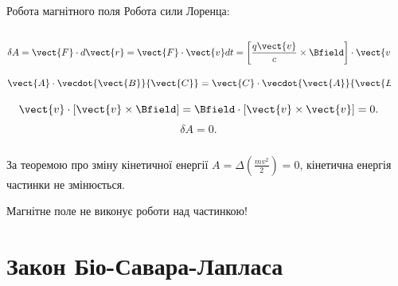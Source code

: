 \documentclass{beamer}
\begin{document}
\begin{frame}{Робота магнітного поля}{}
	Робота сили Лоренца:
	\begin{columns}
		\begin{column}{0.65\linewidth}
			\begin{equation*}
				\delta A = \vect{F}\cdot d\vect{r} = \vect{F}\cdot\vect{v}dt = \left[\frac{q \vect{v}}{c}\times\Bfield\right] \cdot\vect{v}dt.
			\end{equation*}
			\begin{block}{}\scriptsize
				\begin{equation*}
					\vect{A}\cdot\vecdot{\vect{B}}{\vect{C}} = \vect{C}\cdot\vecdot{\vect{A}}{\vect{B}}.
				\end{equation*}
			\end{block}
			\begin{equation*}
				\vect{v}\cdot\left[\vect{v}\times\Bfield\right] = \Bfield\cdot\left[\vect{v}\times\vect{v}\right] = 0.
			\end{equation*}
			\begin{equation*}
				\delta A = 0.
			\end{equation*}
		\end{column}
		\begin{column}{0.35\linewidth}\centering
            
		\end{column}
	\end{columns}
	\begin{block}{}
		За теоремою про зміну кінетичної енергії $A = \Delta\left(\frac{mv^2}{2}\right) = 0$, кінетична енергія частинки не змінюється.
	\end{block}
	\begin{alertblock}{}\centering
		Магнітне поле не виконує роботи над частинкою!
	\end{alertblock}
\end{frame}



\section{Закон Біо-Савара-Лапласа}
\end{document}
